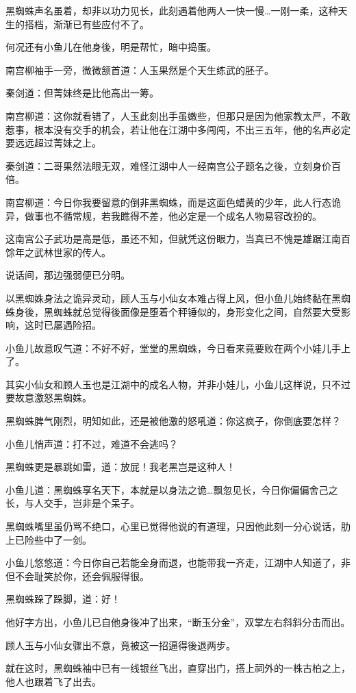 \documentclass[12pt,oneside]{book}
\begin{document}
黑蜘蛛声名虽着，却非以功力见长，此刻遇着他两人一快一慢\ldots 一刚一柔，这种天生的搭档，渐渐已有些应付不了。

何况还有小鱼儿在他身後，明是帮忙，暗中捣蛋。

南宫柳袖手一旁，微微颔首道：人玉果然是个天生练武的胚子。

秦剑道：但菁妹终是比他高出一筹。

南宫柳道：这你就看错了，人玉此刻出手虽嫩些，但那只是因为他家教太严，不敢惹事，根本没有交手的机会，若让他在江湖中多闯闯，不出三五年，他的名声必定要远远超过菁妹之上。

秦剑道：二哥果然法眼无双，难怪江湖中人一经南宫公子题名之後，立刻身价百倍。

南宫柳道：今日你我要留意的倒非黑蜘蛛，而是这面色蜡黄的少年，此人行态诡异，做事也不循常规，若我瞧得不差，他必定是一个成名人物易容改扮的。

这南宫公子武功是高是低，虽还不知，但就凭这份眼力，当真已不愧是雄踞江南百馀年之武林世家的传人。

说话间，那边强弱便已分明。

以黑蜘姝身法之诡异灵动，顾人玉与小仙女本难占得上风，但小鱼儿始终黏在黑蜘蛛身後，黑蜘蛛就总觉得後面像是堕着个秤锤似的，身形变化之间，自然要大受影响，这时已屡遇险招。

小鱼儿故意叹气道：不好不好，堂堂的黑蜘蛛，今日看来竟要败在两个小娃儿手上了。

其实小仙女和顾人玉也是江湖中的成名人物，并非小娃儿，小鱼儿这样说，只不过要故意激怒黑蜘姝。

黑蜘蛛脾气刚烈，明知如此，还是被他激的怒吼道：你这疯子，你倒底要怎样？

小鱼儿悄声道：打不过，难道不会逃吗？

黑蜘蛛更是暴跳如雷，道：放屁！我老黑岂是这种人！

小鱼儿道：黑蜘蛛享名天下，本就是以身法之诡\ldots 飘忽见长，今日你偏偏舍己之长，与人交手，岂非是个呆子。

黑蜘蛛嘴里虽仍骂不绝口，心里已觉得他说的有道理，只因他此刻一分心说话，肋上已险些中了一剑。

小鱼儿悠悠道：今日你自己若能全身而退，也能带我一齐走，江湖中人知道了，非但不会耻笑於你，还会佩服得很。

黑蜘蛛跺了跺脚，道：好！

他好字方出，小鱼儿已自他身後冲了出来，``断玉分金''，双掌左右斜斜分击而出。

顾人玉与小仙女骤出不意，竟被这一招逼得後退两步。

就在这时，黑蜘蛛袖中已有一线银丝飞出，直穿出门，搭上祠外的一株古柏之上，他人也跟着飞了出去。
\end{document}
